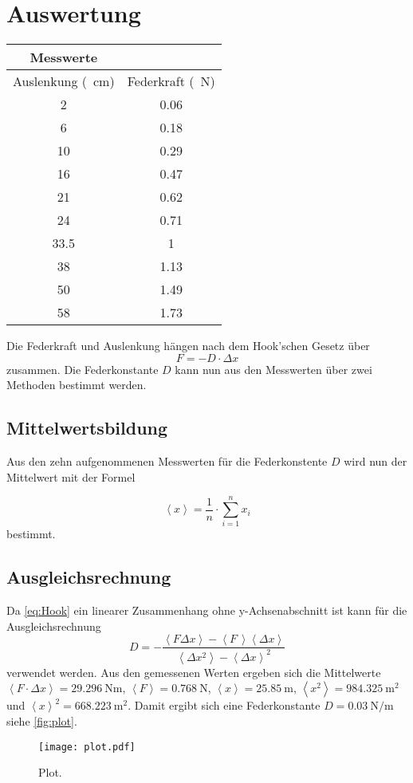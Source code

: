 \section{Auswertung}
\label{sec:Auswertung}
\begin{table}
  \centering
  \begin{tabular}{c c}
  \toprule
  Messwerte\\  
  \midrule 
  Auslenkung (\SI{}{\centi\meter}) & Federkraft (\SI{}{\newton})\\ 
  \midrule 
  2 & 0.06 \\
  6 & 0.18 \\
  10 & 0.29 \\
  16 & 0.47 \\
  21 & 0.62 \\
  24 & 0.71 \\
  33.5 & 1 \\
  38 & 1.13 \\
  50 & 1.49 \\
  58 & 1.73 \\ 
  \bottomrule
  \end{tabular}
\end{table} 
Die Federkraft und Auslenkung hängen nach dem Hook'schen Gesetz über
\begin{equation}
  \label{eq:Hook}
  F = - D \cdot \Delta x
\end{equation}
zusammen.
Die Federkonstante $D$ kann nun aus den Messwerten über zwei Methoden bestimmt werden.

\subsection{Mittelwertsbildung}
Aus den zehn aufgenommenen Messwerten für die Federkonstente $D$ wird nun der Mittelwert mit der Formel

\begin{equation}
  \label{eq:Mittelwert}
  \left< x \right> = \frac{1}{n} \cdot \sum_{i=1}^{n} x_i
\end{equation}
bestimmt. 

\subsection{Ausgleichsrechnung}

Da \eqref{eq:Hook} ein linearer Zusammenhang ohne y-Achsenabschnitt ist kann für die Ausgleichsrechnung
\begin{equation}
  \label{eq:Lin-Ausgleich}
  D = - \frac
  {\left< F \Delta x \right> - \left< F \, \right> \left< \Delta x \right>}
  {\left< \Delta x^2 \right> - \left< \Delta x \right> ^2}
\end{equation}
verwendet werden.
Aus den gemessenen Werten ergeben sich die Mittelwerte $\left< F \cdot \Delta x \right> = \SI{29.296}{\newton\meter}$, $\left< F \right> = \SI{0.768}{\newton}$, $\left< x \right> = \SI{25.85}{\meter}$, $\left< x^2 \right> = \SI{984.325}{\meter\squared}$ und $\left< x \right> ^2 = \SI{668.223}{\meter\squared}$.
Damit ergibt sich eine Federkonstante $D=\SI{0.03}{\newton\per\meter}$ siehe \autoref{fig:plot}.

\begin{figure}
  \centering
  \texttt{[image: plot.pdf]}
  \caption{Plot.}
  \label{fig:plot}
\end{figure}

